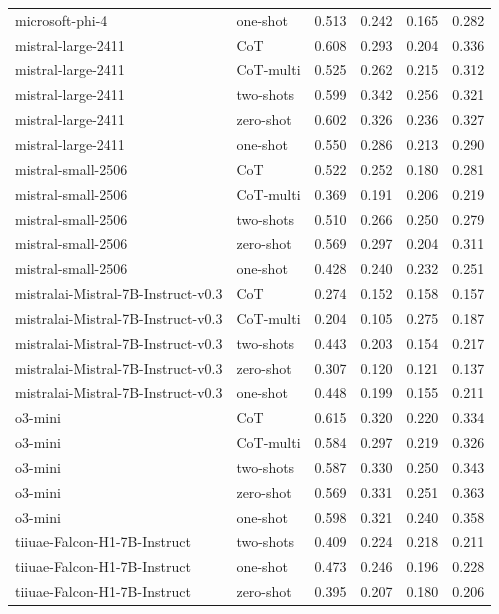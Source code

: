 \begin{tabular}{llrrrr}
microsoft-phi-4 & one-shot & 0.513 & 0.242 & 0.165 & 0.282 \\
mistral-large-2411 & CoT & 0.608 & 0.293 & 0.204 & 0.336 \\
mistral-large-2411 & CoT-multi & 0.525 & 0.262 & 0.215 & 0.312 \\
mistral-large-2411 & two-shots & 0.599 & 0.342 & 0.256 & 0.321 \\
mistral-large-2411 & zero-shot & 0.602 & 0.326 & 0.236 & 0.327 \\
mistral-large-2411 & one-shot & 0.550 & 0.286 & 0.213 & 0.290 \\
mistral-small-2506 & CoT & 0.522 & 0.252 & 0.180 & 0.281 \\
mistral-small-2506 & CoT-multi & 0.369 & 0.191 & 0.206 & 0.219 \\
mistral-small-2506 & two-shots & 0.510 & 0.266 & 0.250 & 0.279 \\
mistral-small-2506 & zero-shot & 0.569 & 0.297 & 0.204 & 0.311 \\
mistral-small-2506 & one-shot & 0.428 & 0.240 & 0.232 & 0.251 \\
mistralai-Mistral-7B-Instruct-v0.3 & CoT & 0.274 & 0.152 & 0.158 & 0.157 \\
mistralai-Mistral-7B-Instruct-v0.3 & CoT-multi & 0.204 & 0.105 & 0.275 & 0.187 \\
mistralai-Mistral-7B-Instruct-v0.3 & two-shots & 0.443 & 0.203 & 0.154 & 0.217 \\
mistralai-Mistral-7B-Instruct-v0.3 & zero-shot & 0.307 & 0.120 & 0.121 & 0.137 \\
mistralai-Mistral-7B-Instruct-v0.3 & one-shot & 0.448 & 0.199 & 0.155 & 0.211 \\
o3-mini & CoT & 0.615 & 0.320 & 0.220 & 0.334 \\
o3-mini & CoT-multi & 0.584 & 0.297 & 0.219 & 0.326 \\
o3-mini & two-shots & 0.587 & 0.330 & 0.250 & 0.343 \\
o3-mini & zero-shot & 0.569 & 0.331 & 0.251 & 0.363 \\
o3-mini & one-shot & 0.598 & 0.321 & 0.240 & 0.358 \\
tiiuae-Falcon-H1-7B-Instruct & two-shots & 0.409 & 0.224 & 0.218 & 0.211 \\
tiiuae-Falcon-H1-7B-Instruct & one-shot & 0.473 & 0.246 & 0.196 & 0.228 \\
tiiuae-Falcon-H1-7B-Instruct & zero-shot & 0.395 & 0.207 & 0.180 & 0.206 \\
\bottomrule
\end{tabular}
